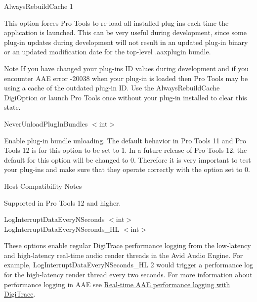 \begin{DoxyItemize}
\item  {\ttfamily Always\+Rebuild\+Cache 1}

This option forces Pro Tools to re-\/load all installed plug-\/ins each time the application is launched. This can be very useful during development, since some plug-\/in updates during development will not result in an updated plug-\/in binary or an updated modification date for the top-\/level .aaxplugin bundle.

\begin{DoxyNote}{Note}
If you have changed your plug-\/in\textquotesingle{}s I\+D values during development and if you encounter A\+A\+E error -\/20038 when your plug-\/in is loaded then Pro Tools may be using a cache of the outdated plug-\/in I\+D. Use the Always\+Rebuild\+Cache Digi\+Option or launch Pro Tools once without your plug-\/in installed to clear this state.
\end{DoxyNote}

\item  {\ttfamily Never\+Unload\+Plug\+In\+Bundles $<$int$>$}

Enable plug-\/in bundle unloading. The default behavior in Pro Tools 11 and Pro Tools 12 is for this option to be set to 1. In a future release of Pro Tools 12, the default for this option will be changed to 0. Therefore it is very important to test your plug-\/ins and make sure that they operate correctly with the option set to 0.

\begin{DoxyRefDesc}{Host Compatibility Notes}
\item[\hyperlink{a00380__compatibility_notes000014}{Host Compatibility Notes}]Supported in Pro Tools 12 and higher.\end{DoxyRefDesc}





\item  {\ttfamily Log\+Interrupt\+Data\+Every\+N\+Seconds $<$int$>$ }~\newline
 {\ttfamily Log\+Interrupt\+Data\+Every\+N\+Seconds\+\_\+\+H\+L $<$int$>$}

These options enable regular Digi\+Trace performance logging from the low-\/latency and high-\/latency real-\/time audio render threads in the Avid Audio Engine. For example, {\ttfamily Log\+Interrupt\+Data\+Every\+N\+Seconds\+\_\+\+H\+L 2} would trigger a performance log for the high-\/latency render thread every two seconds. For more information about performance logging in A\+A\+E see \hyperlink{a00364_digitrace__performancelogging}{Real-\/time A\+A\+E performance logging with Digi\+Trace}.



\end{DoxyItemize}
